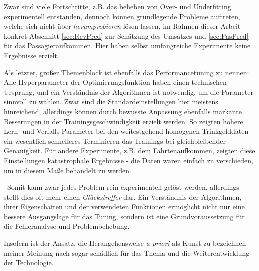 Zwar sind viele Fortschritte, z.B. das beheben von Over- und Underfitting experimentell entstanden, dennoch können 
grundlegende Probleme auftreten, welche sich nicht über \textit{herumprobieren} lösen lassen, im Rahmen dieser Arbeit konkret Abschnitt \ref{sec:RevPred} zur Schätzung des Umsatzes und \ref{sec:PasPred} für das Passagieraufkommen. Hier haben selbst umfangreiche Experimente keine Ergebnisse erzielt.

Als letzter, großer Themenblock ist ebenfalls das Performancetuning zu nennen: Alle Hyperparameter der Optimierungsfunktion haben einen technischen Ursprung, und ein Verständnis der Algorithmen ist notwendig, um die Parameter sinnvoll zu wählen. Zwar sind die Standardeinstellungen hier meistens hinreichend, allerdings können durch bewusste Anpassung ebenfalls markante Besserungen in der Trainingsgeschwindigkeit erzielt werden. So zeigten höhere Lern- und Verfalls-Parameter bei den weitestgehend homogenen Trinkgelddaten ein wesentlich schnelleres Terminieren das Trainings bei gleichbleibender Genauigkeit. Für andere Experimente, z.B. dem Fahrtenaufkommen, zeigten diese Einstellungen katastrophale Ergebnisse - die Daten waren einfach zu verschieden, um in diesem Maße behandelt zu werden. 

~\newline Somit kann zwar jedes Problem rein experimentell gelöst werden, allerdings stellt dies oft mehr einen \textit{Glückstreffer} dar. Ein Verständnis der Algorithmen, ihrer Eigenschaften und der verwendeten Funktionen ermöglicht nicht nur eine bessere Ausgangslage für das Tuning, sondern ist eine Grundvoraussetzung für die Fehleranalyse und Problembehebung. 

Insofern ist der Ansatz, die Herangehensweise \textit{a priori} als Kunst zu bezeichnen meiner Meinung nach sogar schädlich für das Thema und die Weiterentwicklung der Technologie. 